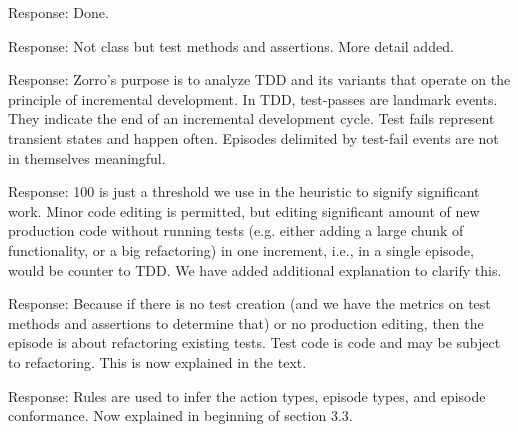 \documentclass[11pt]{article}
\begin{document}
\noindent Response: Done.


\noindent Response: Not class but test methods and assertions. More detail added.


\noindent Response: Zorro's purpose is to analyze TDD and its variants that
operate on the principle of incremental development. In TDD, test-passes
are landmark events. They indicate the end of an incremental development
cycle. Test fails represent transient states and happen often. Episodes
delimited by test-fail events are not in themselves meaningful.


\noindent Response: 100 is just a threshold we use in the heuristic to
signify significant work. Minor code editing is permitted, but editing
significant amount of new production code without running tests
(e.g. either adding a large chunk of functionality, or a big refactoring)
in one increment, i.e., in a single episode, would be counter to TDD.  We have 
added additional explanation to clarify this.


\noindent Response: Because if there is no test creation (and we have the
metrics on test methods and assertions to determine that) or no production
editing, then the episode is about refactoring existing tests. Test code is
code and may be subject to refactoring. This is now explained in the text.


\noindent Response: Rules are used to infer the action types, episode types, and episode conformance. Now explained in beginning of section 3.3.
\end{document}
